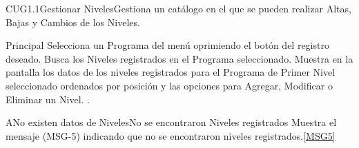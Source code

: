 %  
	\begin{UseCase}{CUG1.1}{Gestionar Niveles}{Gestiona un catálogo en el que se pueden realizar Altas, Bajas y Cambios de los Niveles.}
	\end{UseCase}
	
		
	\begin{UCtrayectoria}{Principal}
		\UCpaso[\UCactor] Selecciona un Programa del menú  oprimiendo el botón  del registro deseado.
		\UCpaso Busca los Niveles registrados en el Programa seleccionado. \label{paso:CUG1.1buscarNiveles}
		\UCpaso Muestra en la pantalla  los datos de los niveles registrados para el Programa de Primer Nivel seleccionado ordenados por posición y las opciones para Agregar, Modificar o Eliminar un Nivel.  .
	\end{UCtrayectoria}
	
	\begin{UCtrayectoriaA}{A}{No existen datos de Niveles}{No se encontraron Niveles registrados}
			\UCpaso[\UCactor] Muestra el mensaje (MSG-5) indicando que no se encontraron niveles registrados.\ref{MSG5}
	\end{UCtrayectoriaA}

